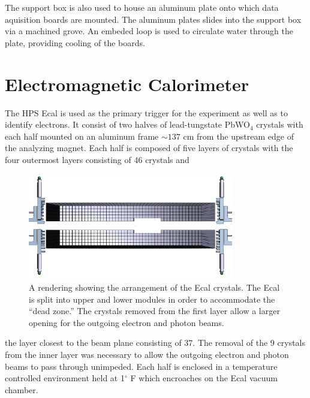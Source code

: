 The support box is also used to house an aluminum plate onto which data 
aquisition boards are mounted.  The aluminum plates slides into the support box
via a machined grove.  An embeded loop is used to circulate water through the
plate, providing cooling of the boards.


\section{Electromagnetic Calorimeter}

The HPS Ecal is used as the primary trigger for the experiment as well as to
identify electrons.  It consist of two halves of lead-tungstate 
PbWO$_4$ crystals with each half mounted on an aluminum frame $\sim 137$ cm 
from the upstream edge of the analyzing magnet.  Each half is composed of five
layers of crystals with the four outermost layers consisting of 46 crystals and 
\begin{figure}
    \centering
    \includegraphics[width=0.8\textwidth]{images/ecal_layout.png}
    \caption{A rendering showing the arrangement of the Ecal crystals.  The Ecal
             is split into upper and lower modules in order to accommodate the 
             ``dead zone.''  The crystals removed from the first layer allow
             a larger opening for the outgoing electron and photon beams.}
    \label{fig:ecal_layout}
\end{figure}
the layer closest to the beam plane consisting of 37. The removal of the 9 
crystals from the inner layer was necessary to allow the outgoing electron and
photon beams to pass through unimpeded.  Each half is enclosed in a temperature
controlled environment held at 1$^{\circ}$ F which encroaches on the Ecal 
vacuum chamber.

